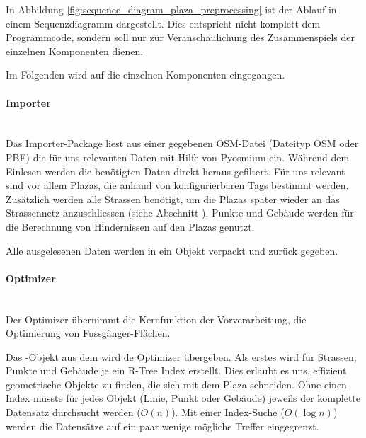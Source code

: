 In Abbildung \ref{fig:sequence_diagram_plaza_preprocessing} ist der Ablauf in einem Sequenzdiagramm dargestellt. Dies entspricht nicht komplett dem Programmcode, sondern soll nur zur Veranschaulichung des Zusammenspiels der einzelnen Komponenten dienen.

Im Folgenden wird auf die einzelnen Komponenten eingegangen.

\paragraph{Importer}\label{impl:Importer}~\\
Das Importer-Package liest aus einer gegebenen \ac{OSM}-Datei (Dateityp \ac{OSM} oder \ac{PBF}) die für uns relevanten Daten mit Hilfe von Pyosmium \cite{pyosmium} ein. Während dem Einlesen werden die benötigten Daten direkt heraus gefiltert. Für uns relevant sind vor allem Plazas, die anhand von konfigurierbaren Tags bestimmt werden. Zusätzlich werden alle Strassen benötigt, um die Plazas später wieder an das Strassennetz anzuschliessen (siehe Abschnitt ). Punkte und Gebäude werden für die Berechnung von Hindernissen auf den Plazas genutzt.

Alle ausgelesenen Daten werden in ein  Objekt verpackt und zurück gegeben.

\paragraph{Optimizer}\label{impl:Optimizer}~\\
Der Optimizer übernimmt die Kernfunktion der Vorverarbeitung, die Optimierung von Fussgänger-Flächen.

Das -Objekt aus dem  wird de Optimizer übergeben. Als erstes wird für Strassen, Punkte und Gebäude je ein R-Tree \cite{rtree_Guttman} Index erstellt. Dies erlaubt es uns, effizient geometrische Objekte zu finden, die sich mit dem Plaza schneiden. Ohne einen Index müsste für jedes Objekt (Linie, Punkt oder Gebäude) jeweils der komplette Datensatz durchsucht werden ($O(n)$). Mit einer Index-Suche ($O(\log n)$) werden die Datensätze auf ein paar wenige mögliche Treffer eingegrenzt.

